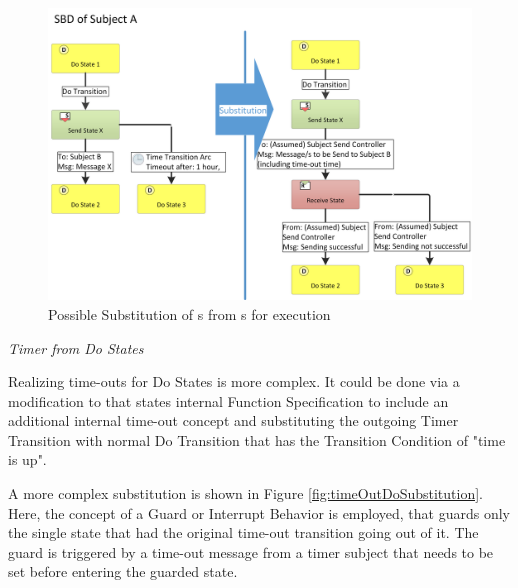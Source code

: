 \begin{figure}[hp]
	\centering
	\includegraphics[width=1.0\linewidth]{Figures/Ontology/TimeOutSendStateInterpretationSBD.png}
	\caption[Possible Substitution of s from s for execution]{Possible Substitution of s from s for execution}
	\label{fig:timeOutSendSubstitution}
\end{figure}

\emph{Timer from Do States}

Realizing time-outs for Do States is more complex. It could be done via a modification to that states internal Function Specification to include an additional internal time-out concept and substituting the outgoing Timer Transition with normal Do Transition that has the Transition Condition of  "time is up". 

A more complex substitution is shown in Figure \ref{fig:timeOutDoSubstitution}. Here, the concept of a Guard or Interrupt Behavior is employed, that guards only the single state that had the original time-out transition going out of it. The guard is triggered by a time-out message from a timer subject that needs to be set before entering the guarded state.

